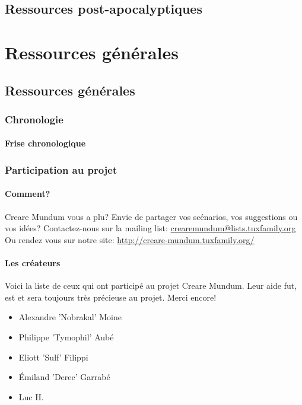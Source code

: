 \documentclass{book}
\begin{document}
\chapter{Ressources post-apocalyptiques}


\part{Ressources générales}
\chapter*{Ressources générales}
\section{Chronologie}
\subsection{Frise chronologique}

\newpage
\section{Participation au projet}
\subsection{Comment?}
\hypertarget{participation}{}
Creare Mundum vous a plu? 
Envie de partager vos scénarios, vos suggestions ou vos idées?
\newline
Contactez-nous sur la mailing list: \href {mailto:crearemundum@lists.tuxfamily.org}{crearemundum@lists.tuxfamily.org}
\newline
Ou rendez vous sur notre site: \href {http://creare-mundum.tuxfamily.org/} {http://creare-mundum.tuxfamily.org/}
\subsection{Les créateurs}
Voici la liste de ceux qui ont participé au projet Creare Mundum. Leur aide fut, est et sera toujours très précieuse au projet. Merci encore!  
\begin{itemize}
\item Alexandre ’Nobrakal’ Moine 
\item Philippe ’Tymophil’ Aubé 
\item Eliott ’Sulf’ Filippi
\item Émiland ’Derec’ Garrabé
\item Luc H.
\end{itemize}
\end{document}
